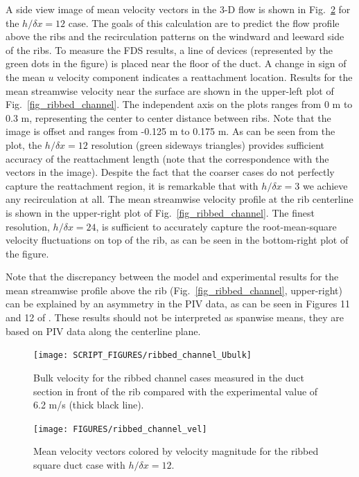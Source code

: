\documentclass[11pt]{book}
\begin{document}
A side view image of mean velocity vectors in the 3-D flow is shown in Fig.~\ref{fig_ribbed_channel_image} for the $h/\delta x = 12$ case.  The goals of this calculation are to predict the flow profile above the ribs and the recirculation patterns on the windward and leeward side of the ribs.  To measure the FDS results, a line of devices (represented by the green dots in the figure) is placed near the floor of the duct.  A change in sign of the mean $u$ velocity component indicates a reattachment location.  Results for the mean streamwise velocity near the surface are shown in the upper-left plot of Fig.~\ref{fig_ribbed_channel}.  The independent axis on the plots ranges from 0 m to 0.3 m, representing the center to center distance between ribs.  Note that the image is offset and ranges from -0.125 m to 0.175 m.  As can be seen from the plot, the $h/\delta x = 12$ resolution (green sideways triangles) provides sufficient accuracy of the reattachment length (note that the correspondence with the vectors in the image).  Despite the fact that the coarser cases do not perfectly capture the reattachment region, it is remarkable that with $h/\delta x = 3$ we achieve any recirculation at all.  The mean streamwise velocity profile at the rib centerline is shown in the upper-right plot of Fig.~\ref{fig_ribbed_channel}. The finest resolution, $h/\delta x=24$, is sufficient to accurately capture the root-mean-square velocity fluctuations on top of the rib, as can be seen in the bottom-right plot of the figure.

Note that the discrepancy between the model and experimental results for the mean streamwise profile above the rib (Fig.~\ref{fig_ribbed_channel}, upper-right) can be explained by an asymmetry in the PIV data, as can be seen in Figures 11 and 12 of \cite{Casara:2}.  These results should not be interpreted as spanwise means, they are based on PIV data along the centerline plane.

\begin{figure}[ht]
\centering
\texttt{[image: SCRIPT\_FIGURES/ribbed\_channel\_Ubulk]}
\caption[Bulk velocity {\ct ribbed\_channel} test case]{Bulk velocity for the ribbed channel cases measured in the duct section in front of the rib compared with the experimental value of 6.2 m/s (thick black line).}
\label{fig_ribbed_channel_Ubulk}
\end{figure}

\begin{figure}[ht]
\centering
\texttt{[image: FIGURES/ribbed\_channel\_vel]}
\caption[The {\ct ribbed\_channel} test case]{Mean velocity vectors colored by velocity magnitude for the ribbed square duct case with $h/\delta x = 12$.}
\label{fig_ribbed_channel_image}
\end{figure}
\end{document}
